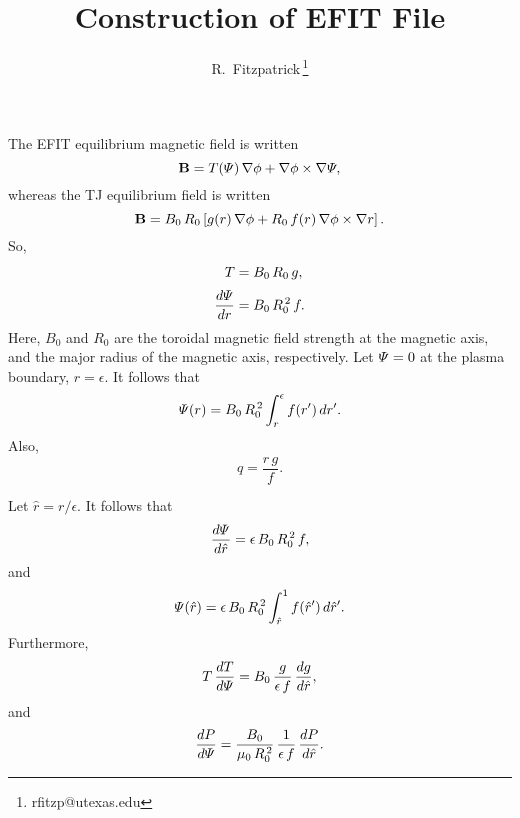 \documentclass[12pt,prb,aps,notitlepage]{revtex4-1}
\begin{document}
\title{Construction of EFIT File}
\author{R.~Fitzpatrick\,\footnote{rfitzp@utexas.edu}}
\begin{abstract}
\end{abstract}
\maketitle

The EFIT equilibrium magnetic field is written
\begin{equation}
{\bf B} = T({\mit\Psi})\,\nabla\phi + \nabla\phi\times \nabla{\mit\Psi},
\end{equation}
whereas the TJ equilibrium field is written
\begin{equation}
{\bf B} = B_0\,R_0\left[g(r)\,\nabla\phi+R_0\,f(r)\,\nabla\phi\times\nabla r\right].
\end{equation}
So,
\begin{align}
T &= B_0\,R_0\,g,\\[0.5ex]
\frac{d{\mit\Psi}}{dr} &= B_0\,R_0^{\,2}\,f.
\end{align}
Here, $B_0$ and $R_0$ are the toroidal magnetic field strength at the magnetic axis, and the major radius of the 
magnetic axis, respectively. Let ${\mit\Psi}=0$ at the plasma boundary, $r=\epsilon$. It follows that
\begin{equation}
{\mit\Psi}(r) = B_0\,R_0^{\,2}\int_r^\epsilon f(r')\,dr'.
\end{equation}
Also,
\begin{equation}
q =\frac{r\,g}{f}.
\end{equation}

Let $\hat{r}=r/\epsilon$. It follows that
\begin{equation}
\frac{d{\mit\Psi}}{d\hat{r}} = \epsilon\,B_0\,R_0^{\,2}\,f,
\end{equation}
and
\begin{equation}
{\mit\Psi}(\hat{r}) = \epsilon\,B_0\,R_0^{\,2}\int_{\hat{r}}^1 f(\hat{r}')\,d\hat{r}'.
\end{equation}
Furthermore,
\begin{equation}
T\,\frac{dT}{d{\mit\Psi}}= B_0\,\frac{g}{\epsilon\,f}\,\frac{dg}{d\hat{r}},
\end{equation}
and
\begin{equation}
\frac{dP}{d{\mit\Psi}}= \frac{B_0}{\mu_0\,R_0^{\,2}}\,\frac{1}{\epsilon\,f}\,\frac{dP}{d\hat{r}}.
\end{equation}
\end{document}
